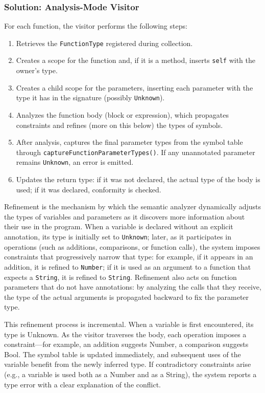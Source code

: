 \documentclass[12pt,a4paper]{report}
\begin{document}
\subsubsection{Solution: Analysis-Mode Visitor}

For each function, the visitor performs the following steps:

\begin{enumerate}
    \item Retrieves the \texttt{FunctionType} registered during collection.
    \item Creates a scope for the function and, if it is a method, inserts \texttt{self} with the owner's type.
    \item Creates a child scope for the parameters, inserting each parameter with the type it has in the signature (possibly \texttt{Unknown}).
    \item Analyzes the function body (block or expression), which propagates constraints and refines (more on this below) the types of symbols.
    \item After analysis, captures the final parameter types from the symbol table through \texttt{captureFunctionParameterTypes()}.
    If any unannotated parameter remains \texttt{Unknown}, an error is emitted.
    \item Updates the return type: if it was not declared, the actual type of the body is used;
    if it was declared, conformity is checked.
\end{enumerate}

Refinement is the mechanism by which the semantic analyzer dynamically adjusts
the types of variables and parameters as it discovers more information
about their use in the program.
When a variable is declared without an explicit annotation, its type is initially set
to \texttt{Unknown};
later, as it participates in operations (such as additions, comparisons, or function calls),
the system imposes constraints that progressively narrow that type: for example, if it appears in an addition, it is refined to \texttt{Number};
if it is used as an argument to a function that expects a \texttt{String}, it is refined to \texttt{String}.
Refinement also acts on function parameters that do not have annotations: by analyzing the calls
that they receive, the type of the actual arguments is propagated backward to fix the parameter type.
\newline

This refinement process is incremental. When a variable is first encountered, its type is Unknown. As the visitor traverses the body, each operation imposes a constraint—for example, an addition suggests Number, a comparison suggests Bool.
 The symbol table is updated immediately, and subsequent uses of the variable benefit from the newly inferred type.
  If contradictory constraints arise (e.g., a variable is used both as a Number and as a String), the system reports a type error with a clear
 explanation of the conflict.
\end{document}
